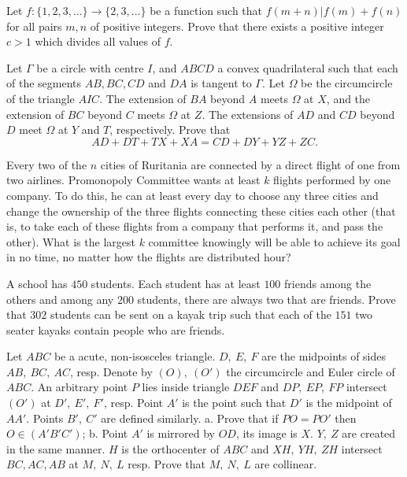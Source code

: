 \documentclass[11pt]{scrartcl}
\begin{document}
\begin{problem}[208441124738479]
Let $f : \{ 1, 2, 3, \dots \} \to \{ 2, 3, \dots \}$ be a function such that $f(m + n) | f(m) + f(n) $ for all pairs $m,n$ of positive integers. Prove that there exists a positive integer $c > 1$ which divides all values of $f$.
\end{problem}
\begin{problem}[240654526717277]
Let $\Gamma$ be a circle with centre $I$, and $A B C D$ a convex quadrilateral such that each of the segments $A B, B C, C D$ and $D A$ is tangent to $\Gamma$. Let $\Omega$ be the circumcircle of the triangle $A I C$. The extension of $B A$ beyond $A$ meets $\Omega$ at $X$, and the extension of $B C$ beyond $C$ meets $\Omega$ at $Z$. The extensions of $A D$ and $C D$ beyond $D$ meet $\Omega$ at $Y$ and $T$, respectively. Prove that\[A D+D T+T X+X A=C D+D Y+Y Z+Z C.\]
\end{problem}
\begin{problem}[231259391294064]
Every two of the $n$ cities of Ruritania are connected by a direct flight of one from two airlines. Promonopoly Committee wants at least $k$ flights performed by one company. To do this, he can at least every day to choose any three cities and change the ownership of the three flights connecting these cities each other (that is, to take each of these flights from a company that performs it, and pass the other). What is the largest $k$ committee knowingly will be able to achieve its goal in no time, no matter how the flights are distributed hour?
\end{problem}
\begin{problem}[8005762280394288133]
A school has $450$ students. Each student has at least $100$ friends among the others and among any $200$ students, there are always two that are friends. Prove that $302$ students can be sent on a kayak trip such that each of the $151$ two seater kayaks contain people who are friends.
\end{problem}
\begin{problem}[7220404010846068686]
	Let $ABC$ be a acute, non-isosceles triangle. $D,\ E,\ F$ are the midpoints of sides $AB,\ BC,\ AC$, resp. Denote by $(O),\ (O')$ the circumcircle and Euler circle of $ABC$. An arbitrary point $P$ lies inside triangle $DEF$ and $DP,\ EP,\ FP$ intersect $(O')$ at $D',\ E',\ F'$, resp. Point $A'$ is the point such that $D'$ is the midpoint of $AA'$. Points $B',\ C'$ are defined similarly.
a. Prove that if $PO=PO'$ then $O\in(A'B'C')$;
b. Point $A'$ is mirrored by $OD$, its image is $X$. $Y,\ Z$ are created in the same manner. $H$ is the orthocenter of $ABC$ and $XH,\ YH,\ ZH$ intersect $BC, AC, AB$ at $M,\ N,\ L$ resp. Prove that $M,\ N,\ L$ are collinear.
\end{problem}
\end{document}
